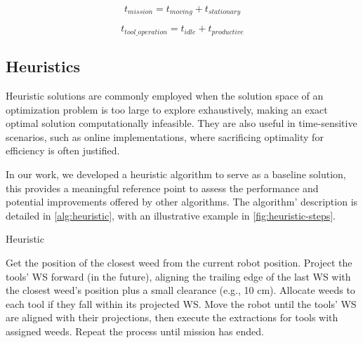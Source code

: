 \begin{equation}
    t_{mission} = t_{moving} + t_{stationary}
    \label{eq:total-mission-time}
\end{equation}

\begin{equation}
    t_{tool\_operation} = t_{idle} + t_{productive}
    \label{eq:tool-usage-time}
\end{equation}


\subsection{Heuristics}
Heuristic solutions are commonly employed when the solution space of an optimization problem is too large to explore exhaustively, making an exact optimal solution computationally infeasible. They are also useful in time-sensitive scenarios, such as online implementations, where sacrificing optimality for efficiency is often justified.

In our work, we developed a heuristic algorithm to serve as a baseline solution, this provides a meaningful reference point to assess the performance and potential improvements offered by other algorithms. The algorithm' description is detailed in \ref{alg:heuristic}, with an illustrative example in \autoref{fig:heuristic-steps}.

\begin{algorithm}
    \caption{Heuristic}
    \begin{algorithmic}[1]
        \STATE Get the position of the closest weed from the current robot position.
        \STATE Project the tools' \ac{WS} forward (in the future), aligning the trailing edge of the last \ac{WS} with the closest weed's position plus a small clearance (e.g., 10 cm).
        \STATE Allocate weeds to each tool if they fall within its projected \ac{WS}.
        \STATE Move the robot until the tools' \ac{WS} are aligned with their projections, then execute the extractions for tools with assigned weeds.
        \STATE Repeat the process until mission has ended.
    \end{algorithmic}
    \label{alg:heuristic}
\end{algorithm}


